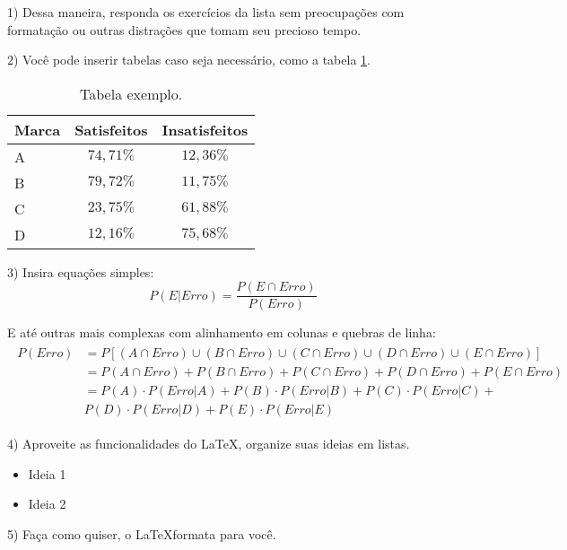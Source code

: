 \documentclass[12pt,a4paper,oneside]{abntex2}
\begin{document}
	
	\textual
	\pagestyle{cabidaluno} %
	
1) Dessa maneira, responda os exercícios da lista sem preocupações com formatação ou outras distrações que tomam seu precioso tempo.

2) Você pode inserir tabelas caso seja necessário, como a tabela \ref{tab:exemplo}.

\begin{table}[htb]
	\center
	\begin{tabular}{|l|c|c|}
		\hline
		\textbf{Marca} & \textbf{Satisfeitos} & \textbf{Insatisfeitos} \\ \hline
		A & $74,71\%$ & $12,36\%$ \\ \hline
		B & $79,72\%$ & $11,75\%$ \\ \hline
		C & $23,75\%$ & $61,88\%$ \\ \hline
		D & $12,16\%$ & $75,68\%$ \\ \hline
	\end{tabular}
	\caption{Tabela exemplo.}
	\label{tab:exemplo}
\end{table}

3) Insira equações simples:
\[
	P(E|Erro) = \frac{P(E \cap Erro)}{P(Erro)}
\]

E até outras mais complexas com alinhamento em colunas e quebras de linha:
\begin{align*}
	\begin{split}
		P(Erro) &= P[(A \cap Erro) \cup (B \cap Erro) \cup (C \cap Erro) \cup (D \cap Erro) \cup (E \cap Erro)] \\
		& = P(A \cap Erro) + P(B \cap Erro) + P(C \cap Erro) + P(D \cap Erro) + P(E \cap Erro) \\
		& = P(A) \cdot P(Erro|A) + P(B) \cdot P(Erro|B) + P(C) \cdot P(Erro|C) + \\
		& P(D) \cdot P(Erro|D) + P(E) \cdot P(Erro|E)		
	\end{split}
\end{align*}

4) Aproveite as funcionalidades do \LaTeX, organize suas ideias em listas.
\begin{itemize}
	\item Ideia 1
	\item Ideia 2
\end{itemize}

5) Faça como quiser, o \LaTeX formata para você.
\end{document}
